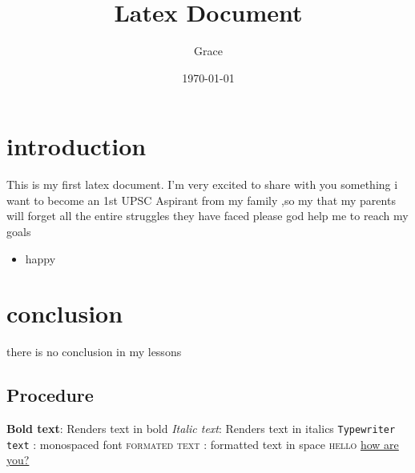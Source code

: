 \documentclass{article}
\title{Latex Document}
\author{Grace}
\date{\today}
\begin{document}
	\section{introduction}
	\label{sec:intro}
	This is my first latex document.
	I'm very excited to share with you something 
	i want to become an 1st UPSC Aspirant from my family ,so my that my parents will forget all the entire struggles they have faced please god help me to reach my goals 
	\begin{itemize}
		\item happy
	\end{itemize}
	\section{conclusion}
	there is no conclusion in my lessons
	
	\subsection{Procedure}
	\label{subsec: procedure}
	
	\textbf{Bold text}: Renders text in bold
	\textit{Italic text}: Renders text in italics
	\texttt{Typewriter text} : monospaced font
	\textsc{formated text }: formatted text in space
	\textsc{hello}
	\underline{how are you?}
\end{document}
